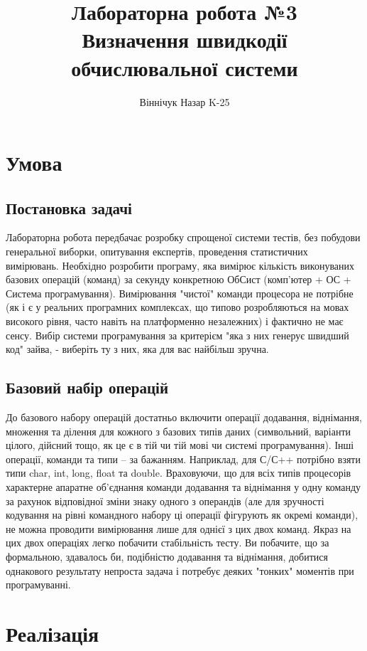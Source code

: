 \documentclass[a4paper]{article}
\title{
    Лабораторна робота №3\\
    Визначення швидкодії обчислювальної системи
}
\author{Віннічук Назар K-25}
\begin{document}
\maketitle
\tableofcontents

\section{Умова}

\subsection{Постановка задачі}

Лабораторна робота передбачає розробку спрощеної системи тестів, без побудови
генеральної виборки, опитування експертів, проведення статистичних вимірювань.
Необхідно розробити програму, яка вимірює кількість виконуваних базових
операцій (команд) за секунду конкретною ОбСист (комп’ютер + ОС + Система
програмування). Вимірювання "чистої" команди процесора не потрібне (як і є у
реальних програмних комплексах, що типово розробляються на мовах високого
рівня, часто навіть на платформенно незалежних) і фактично не має сенсу. Вибір
системи програмування за критерієм "яка з них генерує швидший код" зайва, -
виберіть ту з них, яка для вас найбільш зручна.

\subsection{Базовий набір операцій}

До базового набору операцій достатньо включити операції додавання, віднімання,
множення та ділення для кожного з базових типів даних (символьний, варіанти
цілого, дійсний тощо, як це є в тій чи тій мові чи системі програмування). Інші
операції, команди та типи – за бажанням. Наприклад, для С/С++ потрібно взяти
типи char, int, long, float та double. Враховуючи, що для всіх типів процесорів
характерне апаратне об’єднання команди додавання та віднімання у одну команду
за рахунок відповідної зміни знаку одного з операндів (але для зручності
кодування на рівні командного набору ці операції фігурують як окремі команди),
не можна проводити вимірювання лише для однієї з цих двох команд. Якраз на цих
двох операціях легко побачити стабільність тесту. Ви побачите, що за
формальною, здавалось би, подібністю додавання та віднімання, добитися
однакового результату непроста задача і потребує деяких "тонких" моментів при
програмуванні.

\section{Реалізація}
\end{document}
